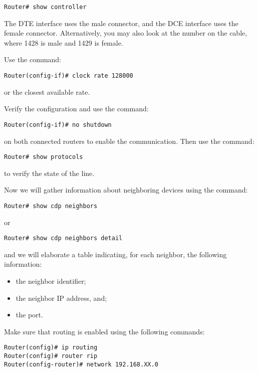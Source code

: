 \begin{lstlisting}
Router# show controller
\end{lstlisting}

The DTE interface uses the male connector, and the DCE interface uses the female connector. Alternatively, you may also look at the number on the cable, where 1428 is male and 1429 is female.

Use the command:

\begin{lstlisting}
Router(config-if)# clock rate 128000
\end{lstlisting}

or the closest available rate.

Verify the configuration and use the command:

\begin{lstlisting}
Router(config-if)# no shutdown
\end{lstlisting}

on both connected routers to enable the communication. Then use the command:

\begin{lstlisting}
Router# show protocols
\end{lstlisting}

to verify the state of the line.

Now we will gather information about neighboring devices using the command:

\begin{lstlisting}
Router# show cdp neighbors
\end{lstlisting}

or

\begin{lstlisting}
Router# show cdp neighbors detail
\end{lstlisting}

and we will elaborate a table indicating, for each neighbor, the following information:

\begin{itemize}
\item the neighbor identifier;
\item the neighbor IP address, and;
\item the port.
\end{itemize}

Make sure that routing is enabled using the following commands:

\begin{lstlisting}
Router(config)# ip routing
Router(config)# router rip
Router(config-router)# network 192.168.XX.0
\end{lstlisting}

